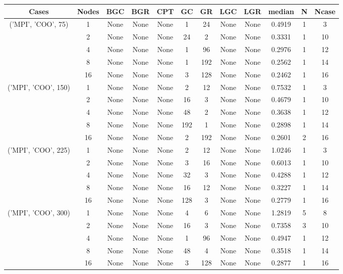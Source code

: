 \begin{tabular}{cccccccccccc}
\hline
Cases & Nodes& BGC& BGR& CPT& GC& GR& LGC& LGR& median & N & Ncase \\
\hline
\multirow{5}{*}{('MPI', 'COO', 75)}& 1& None& None& None& 1& 24& None& None& 0.4919& 1& 3\\
& 2& None& None& None& 24& 2& None& None& 0.3331& 1& 10\\
& 4& None& None& None& 1& 96& None& None& 0.2976& 1& 12\\
& 8& None& None& None& 1& 192& None& None& 0.2562& 1& 14\\
& 16& None& None& None& 3& 128& None& None& 0.2462& 1& 16\\
\hline
\multirow{5}{*}{('MPI', 'COO', 150)}& 1& None& None& None& 2& 12& None& None& 0.7532& 1& 3\\
& 2& None& None& None& 16& 3& None& None& 0.4679& 1& 10\\
& 4& None& None& None& 48& 2& None& None& 0.3638& 1& 12\\
& 8& None& None& None& 192& 1& None& None& 0.2898& 1& 14\\
& 16& None& None& None& 2& 192& None& None& 0.2601& 2& 16\\
\hline
\multirow{5}{*}{('MPI', 'COO', 225)}& 1& None& None& None& 2& 12& None& None& 1.0246& 1& 3\\
& 2& None& None& None& 3& 16& None& None& 0.6013& 1& 10\\
& 4& None& None& None& 32& 3& None& None& 0.4288& 1& 12\\
& 8& None& None& None& 16& 12& None& None& 0.3227& 1& 14\\
& 16& None& None& None& 128& 3& None& None& 0.2779& 1& 16\\
\hline
\multirow{5}{*}{('MPI', 'COO', 300)}& 1& None& None& None& 4& 6& None& None& 1.2819& 5& 8\\
& 2& None& None& None& 16& 3& None& None& 0.7358& 3& 10\\
& 4& None& None& None& 1& 96& None& None& 0.4947& 1& 12\\
& 8& None& None& None& 48& 4& None& None& 0.3518& 1& 14\\
& 16& None& None& None& 3& 128& None& None& 0.2877& 1& 16\\
\hline
\end{tabular}



